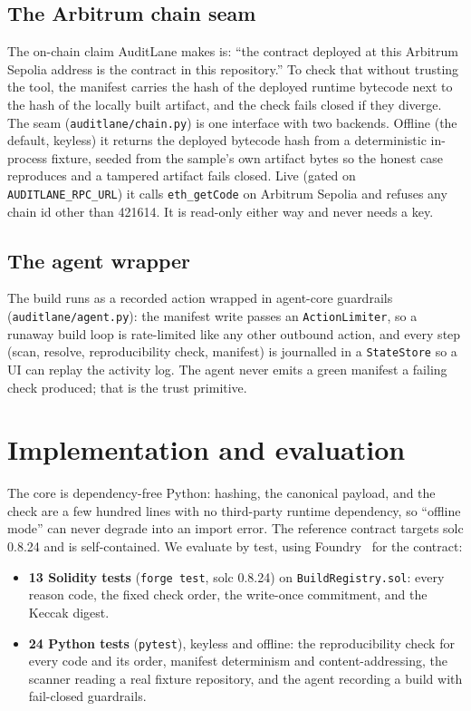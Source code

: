 \documentclass[11pt]{article}
\begin{document}
\subsection{The Arbitrum chain seam}
The on-chain claim AuditLane makes is: ``the contract deployed at this Arbitrum Sepolia
address is the contract in this repository.'' To check that without trusting the tool, the
manifest carries the hash of the deployed runtime bytecode next to the hash of the locally
built artifact, and the check fails closed if they diverge. The seam
(\texttt{auditlane/chain.py}) is one interface with two backends. Offline (the default,
keyless) it returns the deployed bytecode hash from a deterministic in-process fixture,
seeded from the sample's own artifact bytes so the honest case reproduces and a tampered
artifact fails closed. Live (gated on \texttt{AUDITLANE\_RPC\_URL}) it calls
\texttt{eth\_getCode} on Arbitrum Sepolia and refuses any chain id other than 421614. It
is read-only either way and never needs a key.

\subsection{The agent wrapper}
The build runs as a recorded action wrapped in agent-core guardrails
(\texttt{auditlane/agent.py}): the manifest write passes an \texttt{ActionLimiter}, so a
runaway build loop is rate-limited like any other outbound action, and every step (scan,
resolve, reproducibility check, manifest) is journalled in a \texttt{StateStore} so a UI
can replay the activity log. The agent never emits a green manifest a failing check
produced; that is the trust primitive.

\section{Implementation and evaluation}
The core is dependency-free Python: hashing, the canonical payload, and the check are a
few hundred lines with no third-party runtime dependency, so ``offline mode'' can never
degrade into an import error. The reference contract targets solc 0.8.24 and is
self-contained. We evaluate by test, using Foundry~\cite{foundry} for the contract:

\begin{itemize}[leftmargin=1.4em]
\item \textbf{13 Solidity tests} (\texttt{forge test}, solc 0.8.24) on
\texttt{BuildRegistry.sol}: every reason code, the fixed check order, the write-once
commitment, and the Keccak digest.
\item \textbf{24 Python tests} (\texttt{pytest}), keyless and offline: the reproducibility
check for every code and its order, manifest determinism and content-addressing, the
scanner reading a real fixture repository, and the agent recording a build with
fail-closed guardrails.
\end{itemize}
\end{document}
